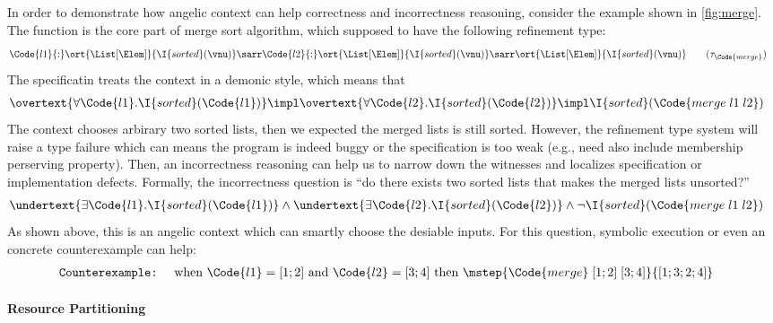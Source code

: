 In order to demonstrate how angelic context can help correctness and incorrectness reasoning, consider the example shown in \autoref{fig:merge}. The function  is the core part of merge sort algorithm, which supposed to have the following refinement type:
\begin{align*}
    &\Code{l1}{:}\ort{\List[\Elem]}{\I{sorted}(\vnu)} \sarr \Code{l2}{:}\ort{\List[\Elem]}{\I{sorted}(\vnu)} \sarr \ort{\List[\Elem]}{\I{sorted}(\vnu)} \tag{$\tau_{\Code{merge}}$}
\end{align*}\noindent
The specificatin treats the context in a demonic style, which means that
\begin{align*}
    &\overtext{\forall \Code{l1}.\I{sorted}(\Code{l1})} \impl \overtext{\forall \Code{l2}. \I{sorted}(\Code{l2})} \impl \I{sorted}(\Code{merge\;l1\;l2})
\end{align*}\noindent
The context chooses arbirary two sorted lists, then we expected the merged lists is still sorted. However, the refinement type system will raise a type failure which can means the program is indeed buggy or the specification is too weak (e.g., need also include membership perserving property). Then, an incorrectness reasoning can help us to narrow down the witnesses and localizes specification or implementation defects. Formally, the incorrectness question is ``do there exists two sorted lists that makes the merged lists unsorted?''
\begin{align*}
    &\undertext{\exists \Code{l1}. \I{sorted}(\Code{l1})} \land \undertext{\exists \Code{l2}. \I{sorted}(\Code{l2})} \land \neg \I{sorted}(\Code{merge\;l1\;l2})
\end{align*}\noindent
As shown above, this is an angelic context which can smartly choose the desiable inputs. For this question, symbolic execution or even an concrete counterexample can help:
\begin{align*}
    \texttt{Counterexample:}&\quad  \text{ when } \Code{l1} = [1;2] \text{ and } \Code{l2} = [3;4] \text{ then } \mstep{\Code{merge}\;[1;2]\;[3;4]}{[1;3;2;4]}
\end{align*}\noindent

\paragraph{Resource Partitioning}


